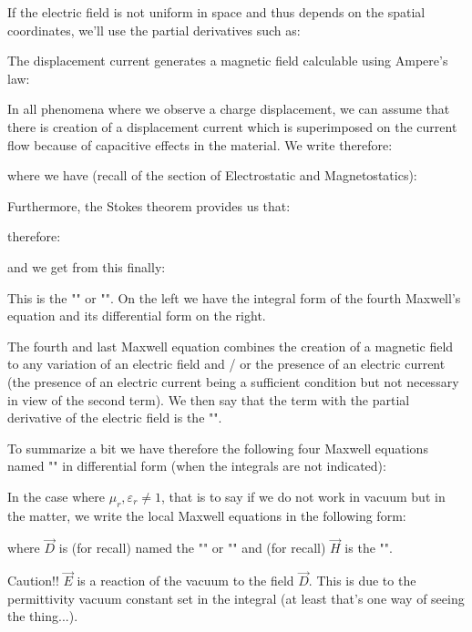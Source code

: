 	If the electric field is not uniform in space and thus depends on the spatial coordinates, we'll use the partial derivatives such as:
	
	The displacement current generates a magnetic field calculable using Ampere's law:
	
	In all phenomena where we observe a charge displacement, we can assume that there is creation of a displacement current which is superimposed on the current flow because of capacitive effects in the material. We write therefore:
	
	where we have (recall of the section of Electrostatic and Magnetostatics):
	
	Furthermore, the Stokes theorem provides us that:
	
	therefore:
	
	and we get from this finally:
	
	This is the "" or "". On the left we have the integral form of the fourth Maxwell's equation and its differential form on the right.
	
	The fourth and last Maxwell equation combines the creation of a magnetic field to any variation of an electric field and / or the presence of an electric current (the presence of an electric current being a sufficient condition but not necessary in view of the second term). We then say that the term with the partial derivative of the electric field is the "".
	
	To summarize a bit we have therefore the following four Maxwell equations named "" in differential form (when the integrals are not indicated):
	
	In the case where $\mu_r,\varepsilon_r\neq 1$, that is to say if we do not work in vacuum but in the matter, we write the local Maxwell equations in the following form:
	
	where $\vec{D}$ is (for recall) named the "" or "" and (for recall) $\vec{H}$ is the "".
	\begin{tcolorbox}[title=Remark,colframe=black,arc=10pt]
	Caution!! $\vec{E}$ is a reaction of the vacuum to the field $\vec{D}$. This is due to the permittivity vacuum constant  set in the integral (at least that's one way of seeing the thing...).
	\end{tcolorbox}
	
